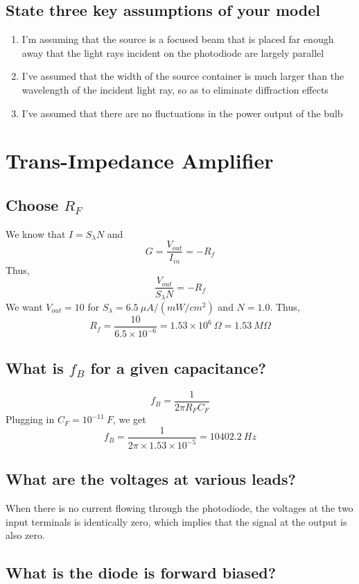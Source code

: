 \documentclass[english]{article}
\begin{document}
\subsection{State three key assumptions of your model}
\begin{enumerate}
\item I'm assuming that the source is a focused beam that is placed far
enough away that the light rays incident on the photodiode are largely
parallel
\item I've assumed that the width of the source container is much larger
than the wavelength of the incident light ray, so as to eliminate
diffraction effects
\item I've assumed that there are no fluctuations in the power output of
the bulb
\end{enumerate}

\section{Trans-Impedance Amplifier}

\subsection{Choose $R_{F}$}

We know that $I=S_{\lambda}N$ and
\[
G=\frac{V_{out}}{I_{in}}=-R_{f}
\]
Thus,
\[
\frac{V_{out}}{S_{\lambda}N}=-R_{f}
\]
We want $V_{out}=10$ for $S_{\lambda}=6.5\ \mu A/\left(mW/cm^{2}\right)$
and $N=1.0$. Thus,
\[
R_{f}=\frac{10}{6.5\times10^{-6}}=1.53\times10^{6}\ \Omega=1.53\ M\Omega
\]

\subsection{What is $f_{B}$ for a given capacitance?}

\[
f_{B}=\frac{1}{2\pi R_{F}C_{F}}
\]
Plugging in $C_{F}=10^{-11}\ F$, we get
\[
f_{B}=\frac{1}{2\pi\times1.53\times10^{-5}}=10402.2\ Hz
\]

\subsection{What are the voltages at various leads?}

When there is no current flowing through the photodiode, the voltages
at the two input terminals is identically zero, which implies that
the signal at the output is also zero.

\subsection{What is the diode is forward biased?}
\end{document}
